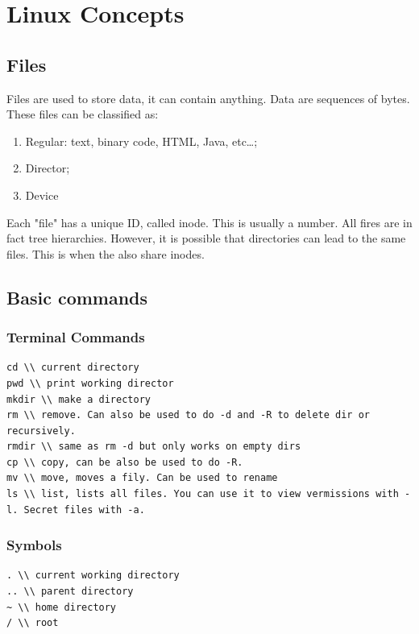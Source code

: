 \documentclass[a4paper]{article}
\theoremstyle{plain}
\theoremstyle{definition}
\theoremstyle{remark}
\begin{document}
\section{Linux Concepts}
\subsection{Files}
Files are used to store data, it can contain anything. Data are sequences of bytes. \\
These files can be classified as:
\begin{enumerate}
	\item Regular: text, binary code, HTML, Java, etc\ldots;
	\item Director;
	\item Device
\end{enumerate}
Each "file" has a unique ID, called inode. This is usually a number. All fires are in fact tree hierarchies. However, it is possible that directories can lead to the same files. This is when the also share inodes.
\subsection{Basic commands}
\subsubsection{Terminal Commands}

\begin{lstlisting}[language = Shell]
cd \\ current directory
pwd \\ print working director
mkdir \\ make a directory
rm \\ remove. Can also be used to do -d and -R to delete dir or recursively.
rmdir \\ same as rm -d but only works on empty dirs
cp \\ copy, can be also be used to do -R.
mv \\ move, moves a fily. Can be used to rename
ls \\ list, lists all files. You can use it to view vermissions with -l. Secret files with -a.
\end{lstlisting}
\subsubsection{Symbols}
\begin{lstlisting}[language = Shell]
. \\ current working directory
.. \\ parent directory
~ \\ home directory
/ \\ root
\end{lstlisting}
\end{document}
